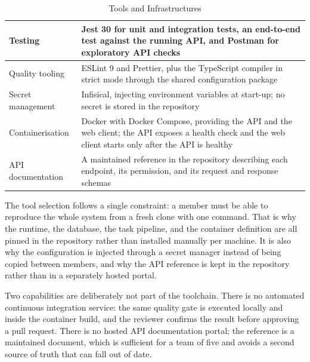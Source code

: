 \begin{table}[H]
\begin{tabular}{|p{3.5cm}|p{9.9cm}|}
\hline
Testing & Jest 30 for unit and integration tests, an end-to-end test against the running API, and Postman for exploratory API checks \\
\hline
Quality tooling & ESLint 9 and Prettier, plus the TypeScript compiler in strict mode through the shared configuration package \\
\hline
Secret management & Infisical, injecting environment variables at start-up; no secret is stored in the repository \\
\hline
Containerisation & Docker with Docker Compose, providing the API and the web client; the API exposes a health check and the web client starts only after the API is healthy \\
\hline
API documentation & A maintained reference in the repository describing each endpoint, its permission, and its request and response schemas \\
\hline
\end{tabular}
\caption{Tools and Infrastructures}
\label{tab:tools}
\end{table}

The tool selection follows a single constraint: a member must be able to reproduce the whole system from a fresh clone with one command. That is why the runtime, the database, the task pipeline, and the container definition are all pinned in the repository rather than installed manually per machine. It is also why the configuration is injected through a secret manager instead of being copied between members, and why the API reference is kept in the repository rather than in a separately hosted portal.

Two capabilities are deliberately not part of the toolchain. There is no automated continuous integration service: the same quality gate is executed locally and inside the container build, and the reviewer confirms the result before approving a pull request. There is no hosted API documentation portal; the reference is a maintained document, which is sufficient for a team of five and avoids a second source of truth that can fall out of date.
